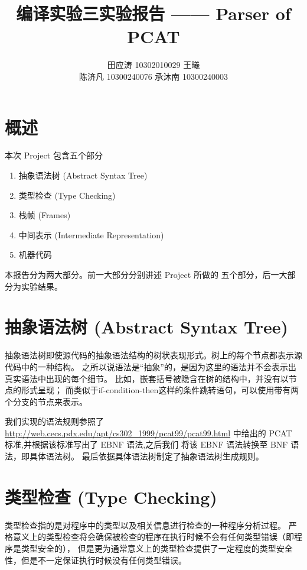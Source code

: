 ﻿\documentclass{article}
\title {编译实验三实验报告 —— Parser of PCAT}
\author {田应涛 10302010029 \quad 王曦 \quad 10300240014\\ 陈济凡 10300240076 \quad 承沐南 10300240003}
\begin{document}
\maketitle
\tableofcontents

\newpage

\section{概述}

本次 Project 包含五个部分
\begin{enumerate}
\item 抽象语法树 (Abstract Syntax Tree)
\item 类型检查 (Type Checking)
\item 栈帧 (Frames)
\item 中间表示 (Intermediate Representation)
\item 机器代码
\end{enumerate}

本报告分为两大部分。前一大部分分别讲述 Project 所做的
五个部分，后一大部分为实验结果。


\section{抽象语法树 (Abstract Syntax Tree)}

抽象语法树即使源代码的抽象语法结构的树状表现形式。树上的每个节点都表示源代码中的一种结构。
之所以说语法是“抽象”的，是因为这里的语法并不会表示出真实语法中出现的每个细节。
比如，嵌套括号被隐含在树的结构中，并没有以节点的形式呈现；
而类似于if-condition-then这样的条件跳转语句，可以使用带有两个分支的节点来表示。

我们实现的语法规则参照了 
\url{http://web.cecs.pdx.edu/apt/cs302_1999/pcat99/pcat99.html}
中给出的 PCAT 标准,并根据该标准写出了 EBNF 语法,之后我们
将该 EBNF 语法转换至 BNF 语法，即具体语法树。
最后依据具体语法树制定了抽象语法树生成规则。



\section{类型检查 (Type Checking)}

类型检查指的是对程序中的类型以及相关信息进行检查的一种程序分析过程。
严格意义上的类型检查将会确保被检查的程序在执行时候不会有任何类型错误（即程序是类型安全的），
但是更为通常意义上的类型检查提供了一定程度的类型安全性，但是不一定保证执行时候没有任何类型错误。
\end{document}
